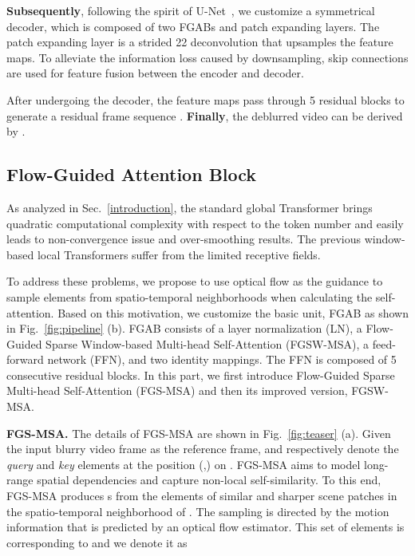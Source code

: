\documentclass{article}
\begin{document}
	\textbf{Subsequently}, following the spirit of U-Net~\cite{unet}, we customize a symmetrical decoder, which is composed of two FGABs and patch expanding layers. The patch expanding layer is a strided 22 deconvolution that upsamples the feature maps. To alleviate the information loss caused by downsampling, skip connections are used for feature fusion between the encoder and decoder.
	
	After undergoing the decoder, the feature maps pass through 5 residual blocks to generate a residual frame sequence . \textbf{Finally}, the deblurred video  can be derived by .
	
	\vspace{-1.5mm}
	\subsection{Flow-Guided Attention Block}
	\vspace{-1mm}
As analyzed in Sec.~\ref{introduction}, the standard global Transformer brings quadratic computational complexity with respect to the token number and easily leads to non-convergence issue and over-smoothing results. The previous window-based local Transformers suffer from the limited receptive fields. 
	
	To address these problems, we propose to use optical flow as the guidance to sample  elements from spatio-temporal neighborhoods when calculating the self-attention. Based on this motivation, we customize the basic unit, FGAB as shown in Fig.~\ref{fig:pipeline} (b). FGAB consists of a layer normalization (LN), a Flow-Guided Sparse Window-based Multi-head Self-Attention (FGSW-MSA), a feed-forward network (FFN), and two identity mappings. The FFN is composed of 5 consecutive residual blocks. In this part, we first introduce Flow-Guided Sparse Multi-head Self-Attention (FGS-MSA) and then its improved version, FGSW-MSA.
	
	\noindent\textbf{FGS-MSA.} The details of FGS-MSA are shown in Fig.~\ref{fig:teaser} (a). Given the  input blurry video frame  as the reference frame,  and   respectively denote the \emph{query} and \emph{key} elements at the position (,) on . FGS-MSA aims to model long-range spatial dependencies and capture non-local self-similarity. To this end, FGS-MSA produces s from the  elements of similar and sharper scene patches in the spatio-temporal neighborhood of . The  sampling is directed by the motion information that is predicted by an optical flow estimator. This set of  elements is corresponding to  and we denote it as 
	
\end{document}
